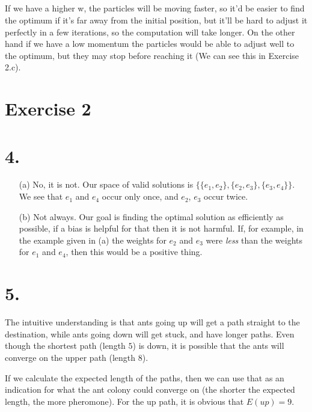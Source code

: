 \documentclass{scrartcl}
\begin{document}
\subsection{}
If we have a higher w, the particles will be moving faster, so it'd be easier to find the optimum if it's far away from the initial position, but it'll be hard to adjust it perfectly in a few iterations, so the computation will take longer.
On the other hand if we have a low momentum the particles would be able to adjust well to the optimum, but they may stop before reaching it (We can see this in Exercise 2.c).

\section{Exercise 2}

\section*{4.}

\begin{itemize}

  \item[(a)]
    No, it is not. Our space of valid solutions is $\{\{e_1, e_2\}, \{e_2,
    e_3\}, \{e_3, e_4\}\}$. We see that $e_1$ and $e_4$ occur only once,
    and $e_2$, $e_3$ occur twice.

  \item[(b)]
    Not always. Our goal is finding the optimal solution as efficiently as
    possible, if a bias is helpful for that then it is not harmful. If,
    for example, in the example given in (a) the weights for $e_2$ and
    $e_3$ were \emph{less} than the weights for $e_1$ and $e_4$, then this
    would be a positive thing.

\end{itemize}

\section*{5.}
The intuitive understanding is that ants going up will get a path straight
to the destination, while ants going down will get stuck, and have longer
paths. Even though the shortest path (length $5$) is down, it is possible
that the ants will converge on the upper path (length $8$).

If we calculate the expected length of the paths, then we can use that as
an indication for what the ant colony could converge on (the shorter the
expected length, the more pheromone). For the up path,
it is obvious that $E(up) = 9$.
\end{document}
